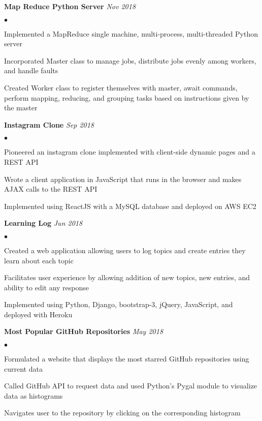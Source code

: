 \documentclass{article}
\newenvironment{achievements}{\begin{list}{$\bullet$}{\topsep 0pt \itemsep 
    -2pt}}{\vspace*{4pt}\end{list}}
\begin{document}
    \textbf{Map Reduce Python Server} \hspace*{0pt}\hfill \textit{Nov 2018}
    \begin{achievements}
        \item Implemented a MapReduce single machine, multi-process, multi-threaded Python server
        \item Incorporated Master class to manage jobs, distribute jobs evenly among workers, and handle faults
        \item Created Worker class to register themselves with master, await commands, perform mapping, reducing, 
        and grouping tasks based on instructions given by the master
    \end{achievements}

    \textbf{Instagram Clone} \hspace*{0pt}\hfill \textit{Sep 2018}
    \begin{achievements}
        \item Pioneered an instagram clone implemented with client-side dynamic pages and a REST API
        \item Wrote a client application in JavaScript that runs in the browser and makes AJAX calls to the REST API
        \item Implemented using ReactJS with a MySQL database and deployed on AWS EC2
    \end{achievements}

    \textbf{Learning Log} \hspace*{0pt}\hfill \textit{Jun 2018}
    \begin{achievements}
        \item Created a web application allowing users to log topics and create entries they learn about each topic
        \item Facilitates user experience by allowing addition of new topics, new entries, and ability to edit any response
        \item Implemented using Python, Django, bootstrap-3, jQuery, JavaScript, and deployed with Heroku
    \end{achievements} 

    \textbf{Most Popular GitHub Repositories} \hspace*{0pt}\hfill \textit{May 2018}
    \begin{achievements} 
        \item Formulated a website that displays the most starred GitHub repositories using current data
        \item Called GitHub API to request data and used Python's Pygal module to visualize data as histograms
        \item Navigates user to the repository by clicking on the corresponding histogram
    \end{achievements}
    
\end{document}
